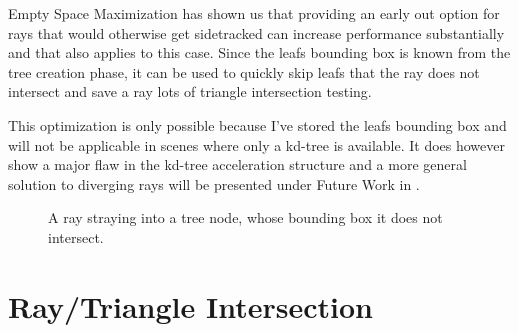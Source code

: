 Empty Space Maximization has shown us that providing an early out option for
rays that would otherwise get sidetracked can increase performance substantially
and that also applies to this case. Since the leafs bounding box is known from
the tree creation phase, it can be used to quickly skip leafs that the ray does
not intersect and save a ray lots of triangle intersection testing.

This optimization is only possible because I've stored the leafs bounding box
and will not be applicable in scenes where only a kd-tree is available. It does
however show a major flaw in the kd-tree acceleration structure and a more
general solution to diverging rays will be presented under Future Work in
.

\begin{figure}
  \centering
  \caption{A ray straying into a tree node, whose bounding box it does
    not intersect.}
  \label{fig:waywardRay}
\end{figure}





\section{Ray/Triangle Intersection}\label{sec:intersection}

